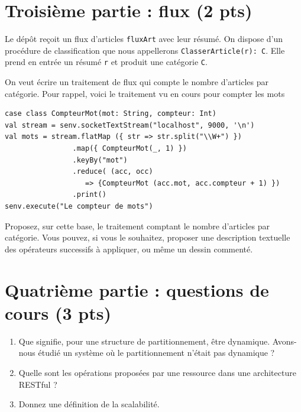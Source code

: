 \documentclass[11pt,a4paper]{article}
\begin{document}
\section*{Troisième partie : flux (2 pts)}

Le dépôt reçoit un flux d'articles \texttt{fluxArt} avec leur résumé. On dispose d'un procédure de classification
que nous appellerons \texttt{ClasserArticle(r): C}. Elle prend en entrée un 
résumé \texttt{r} et produit une catégorie \texttt{C}.

On veut écrire un traitement de flux qui compte le nombre d'articles 
par catégorie. Pour rappel, voici le traitement vu en cours pour compter les mots

\begin{verbatim}
case class CompteurMot(mot: String, compteur: Int)
val stream = senv.socketTextStream("localhost", 9000, '\n')
val mots = stream.flatMap ({ str => str.split("\\W+") })
                .map({ CompteurMot(_, 1) })
                .keyBy("mot")
                .reduce( (acc, occ)  
                   => {CompteurMot (acc.mot, acc.compteur + 1) })
                .print()
senv.execute("Le compteur de mots")
\end{verbatim}

Proposez, sur cette base, le traitement comptant le nombre  d'articles 
par catégorie. Vous pouvez, si vous le souhaitez, proposer une description
textuelle des  opérateurs successifs à appliquer, ou même un dessin commenté.

\section*{Quatrième partie : questions de cours (3 pts)}

\begin{enumerate}
\item Que signifie, pour une structure de partitionnement, être dynamique. 
   Avons-nous  étudié  un système  où  le partitionnement   n'était pas dynamique ?  
   
   \item Quelle sont les opérations proposées par une ressource dans une architecture RESTful ?
 
    \item Donnez une définition de la scalabilité.
\end{enumerate}
\end{document}
